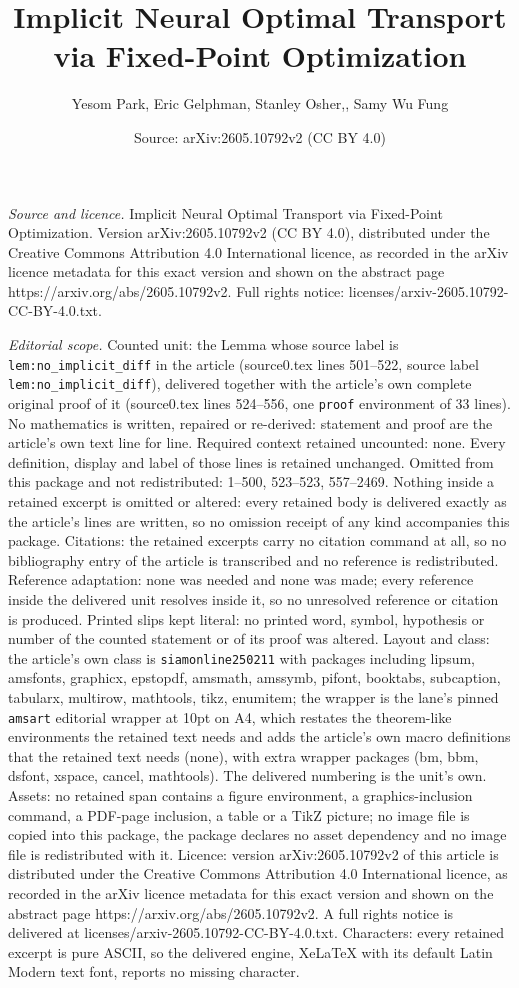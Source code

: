 \documentclass[10pt,a4paper]{amsart}
\title[Implicit Neural Optimal Transport via Fixed-Point Optimizati]{Implicit Neural Optimal Transport via Fixed-Point Optimization}
\author{Yesom Park, Eric Gelphman, Stanley Osher,, Samy Wu Fung}
\date{Source: arXiv:2605.10792v2 (CC BY 4.0)}
\begin{document}
\maketitle

\noindent\emph{Source and licence.} Implicit Neural Optimal Transport via Fixed-Point Optimization. Version arXiv:2605.10792v2 (CC BY 4.0), distributed under the Creative Commons Attribution 4.0 International licence, as recorded in the arXiv licence metadata for this exact version and shown on the abstract page https://arxiv.org/abs/2605.10792v2. Full rights notice: licenses/arxiv-2605.10792-CC-BY-4.0.txt.\par\smallskip

\noindent\textit{Editorial scope.} Counted unit: the Lemma whose source label is \texttt{lem:no\_implicit\_diff} in the article (source0.tex lines 501--522, source label \texttt{lem:no\_implicit\_diff}), delivered together with the article's own complete original proof of it (source0.tex lines 524--556, one \texttt{proof} environment of 33 lines). No mathematics is written, repaired or re-derived: statement and proof are the article's own text line for line. Required context retained uncounted: none. Every definition, display and label of those lines is retained unchanged. Omitted from this package and not redistributed: 1--500, 523--523, 557--2469. Nothing inside a retained excerpt is omitted or altered: every retained body is delivered exactly as the article's lines are written, so no omission receipt of any kind accompanies this package. Citations: the retained excerpts carry no citation command at all, so no bibliography entry of the article is transcribed and no reference is redistributed. Reference adaptation: none was needed and none was made; every reference inside the delivered unit resolves inside it, so no unresolved reference or citation is produced. Printed slips kept literal: no printed word, symbol, hypothesis or number of the counted statement or of its proof was altered. Layout and class: the article's own class is \texttt{siamonline250211} with packages including lipsum, amsfonts, graphicx, epstopdf, amsmath, amssymb, pifont, booktabs, subcaption, tabularx, multirow, mathtools, tikz, enumitem; the wrapper is the lane's pinned \texttt{amsart} editorial wrapper at 10pt on A4, which restates the theorem-like environments the retained text needs and adds the article's own macro definitions that the retained text needs (none), with extra wrapper packages (bm, bbm, dsfont, xspace, cancel, mathtools). The delivered numbering is the unit's own. Assets: no retained span contains a figure environment, a graphics-inclusion command, a PDF-page inclusion, a table or a TikZ picture; no image file is copied into this package, the package declares no asset dependency and no image file is redistributed with it. Licence: version arXiv:2605.10792v2 of this article is distributed under the Creative Commons Attribution 4.0 International licence, as recorded in the arXiv licence metadata for this exact version and shown on the abstract page https://arxiv.org/abs/2605.10792v2. A full rights notice is delivered at licenses/arxiv-2605.10792-CC-BY-4.0.txt. Characters: every retained excerpt is pure ASCII, so the delivered engine, XeLaTeX with its default Latin Modern text font, reports no missing character.
\end{document}
